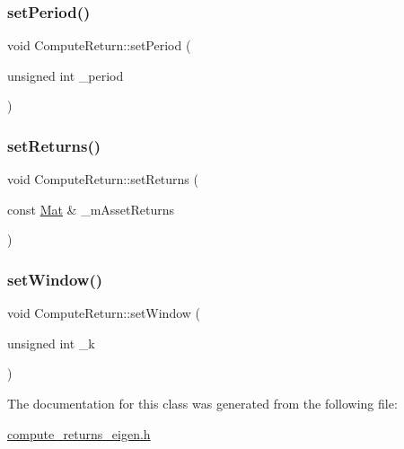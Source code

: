 \subsubsection{\texorpdfstring{set\+Period()}{setPeriod()}}
{\footnotesize\ttfamily void Compute\+Return\+::set\+Period (\begin{DoxyParamCaption}\item[{unsigned int}]{\+\_\+period }\end{DoxyParamCaption})}

\hypertarget{classComputeReturn_ae0594e2da22ca9c96a4ce4f3eebc41eb}{}\label{classComputeReturn_ae0594e2da22ca9c96a4ce4f3eebc41eb} 
\subsubsection{\texorpdfstring{set\+Returns()}{setReturns()}}
{\footnotesize\ttfamily void Compute\+Return\+::set\+Returns (\begin{DoxyParamCaption}\item[{const \hyperlink{compute__returns__eigen_8h_ae14dd28696f743e067dbd2594616bad6}{Mat} \&}]{\+\_\+m\+Asset\+Returns }\end{DoxyParamCaption})}

\hypertarget{classComputeReturn_ae4ae713d72c4015860a8e562dfd51e75}{}\label{classComputeReturn_ae4ae713d72c4015860a8e562dfd51e75} 
\subsubsection{\texorpdfstring{set\+Window()}{setWindow()}}
{\footnotesize\ttfamily void Compute\+Return\+::set\+Window (\begin{DoxyParamCaption}\item[{unsigned int}]{\+\_\+k }\end{DoxyParamCaption})}



The documentation for this class was generated from the following file\+:\begin{DoxyCompactItemize}
\item 
\hyperlink{compute__returns__eigen_8h}{compute\+\_\+returns\+\_\+eigen.\+h}\end{DoxyCompactItemize}
